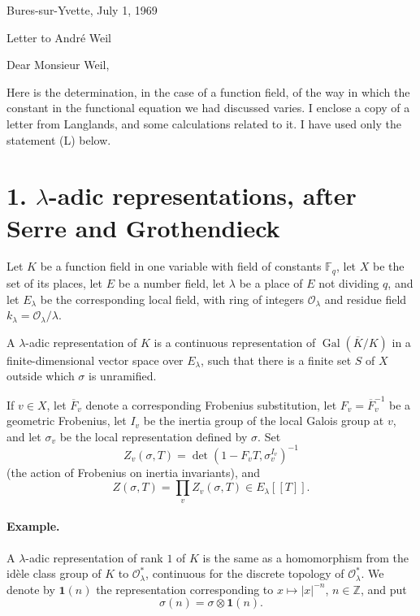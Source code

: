 \documentclass[11pt]{article}
\newcommand{\Fq}{\mathbb F_q}
\newcommand{\Gal}{\operatorname{Gal}}
\newcommand{\cO}{\mathcal O}
\begin{document}
\begin{center}
Bures-sur-Yvette, July 1, 1969

\vspace{1.0cm}
{\Large Letter to André Weil}
\end{center}

\vspace{0.4cm}
Dear Monsieur Weil,

Here is the determination, in the case of a function field, of the way in which the constant in the functional equation we had discussed varies. I enclose a copy of a letter from Langlands, and some calculations related to it. I have used only the statement (L) below.

\section*{1. $\lambda$-adic representations, after Serre and Grothendieck}

Let $K$ be a function field in one variable with field of constants $\Fq$, let $X$ be the set of its places, let $E$ be a number field, let $\lambda$ be a place of $E$ not dividing $q$, and let $E_\lambda$ be the corresponding local field, with ring of integers $\cO_\lambda$ and residue field $k_\lambda=\cO_\lambda/\lambda$.

A $\lambda$-adic representation of $K$ is a continuous representation of $\Gal(\overline K/K)$ in a finite-dimensional vector space over $E_\lambda$, such that there is a finite set $S$ of $X$ outside which $\sigma$ is unramified.

If $v\in X$, let $\overline F_v$ denote a corresponding Frobenius substitution, let $F_v=\overline F_v^{-1}$ be a geometric Frobenius, let $I_v$ be the inertia group of the local Galois group at $v$, and let $\sigma_v$ be the local representation defined by $\sigma$. Set
\[
 Z_v(\sigma,T)=\det(1-F_vT,\sigma_v^{I_v})^{-1}
\]
(the action of Frobenius on inertia invariants), and
\[
 Z(\sigma,T)=\prod_v Z_v(\sigma,T)\in E_\lambda[[T]].
\]

\paragraph{Example.} A $\lambda$-adic representation of rank $1$ of $K$ is the same as a homomorphism from the idèle class group of $K$ to $\cO_\lambda^*$, continuous for the discrete topology of $\cO_\lambda^*$. We denote by $\mathbf 1(n)$ the representation corresponding to $x\mapsto |x|^{-n}$, $n\in\mathbb Z$, and put
\[
 \sigma(n)=\sigma\otimes \mathbf 1(n).
\]
\end{document}
